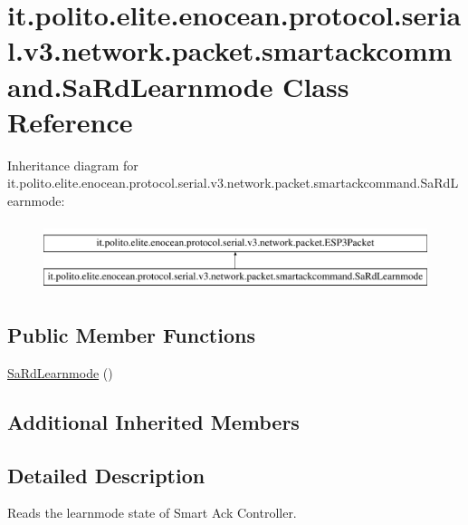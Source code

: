 \hypertarget{classit_1_1polito_1_1elite_1_1enocean_1_1protocol_1_1serial_1_1v3_1_1network_1_1packet_1_1smartackcommand_1_1_sa_rd_learnmode}{}\section{it.\+polito.\+elite.\+enocean.\+protocol.\+serial.\+v3.\+network.\+packet.\+smartackcommand.\+Sa\+Rd\+Learnmode Class Reference}
\label{classit_1_1polito_1_1elite_1_1enocean_1_1protocol_1_1serial_1_1v3_1_1network_1_1packet_1_1smartackcommand_1_1_sa_rd_learnmode}
Inheritance diagram for it.\+polito.\+elite.\+enocean.\+protocol.\+serial.\+v3.\+network.\+packet.\+smartackcommand.\+Sa\+Rd\+Learnmode\+:\begin{figure}[H]
\begin{center}
\leavevmode
\includegraphics[height=2.000000cm]{classit_1_1polito_1_1elite_1_1enocean_1_1protocol_1_1serial_1_1v3_1_1network_1_1packet_1_1smartackcommand_1_1_sa_rd_learnmode}
\end{center}
\end{figure}
\subsection*{Public Member Functions}
\begin{DoxyCompactItemize}
\item 
\hyperlink{classit_1_1polito_1_1elite_1_1enocean_1_1protocol_1_1serial_1_1v3_1_1network_1_1packet_1_1smartackcommand_1_1_sa_rd_learnmode_aa95d07df306960f0e7fb88f08ed5f98f}{Sa\+Rd\+Learnmode} ()
\end{DoxyCompactItemize}
\subsection*{Additional Inherited Members}


\subsection{Detailed Description}
Reads the learnmode state of Smart Ack Controller.

